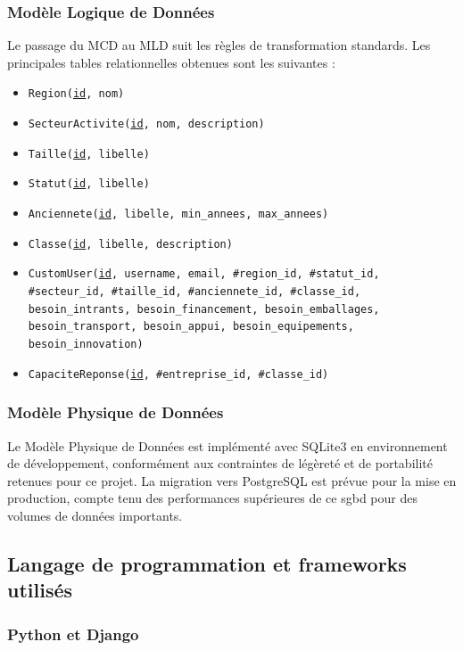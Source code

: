 \documentclass[12pt, a4paper, oneside]{report}
\begin{document}
\subsubsection{Modèle Logique de Données}

Le passage du MCD au MLD suit les règles de transformation standards. Les principales tables relationnelles obtenues sont les suivantes :

\begin{itemize}
  \item \texttt{Region(\underline{id}, nom)}
  \item \texttt{SecteurActivite(\underline{id}, nom, description)}
  \item \texttt{Taille(\underline{id}, libelle)}
  \item \texttt{Statut(\underline{id}, libelle)}
  \item \texttt{Anciennete(\underline{id}, libelle, min\_annees, max\_annees)}
  \item \texttt{Classe(\underline{id}, libelle, description)}
  \item \texttt{CustomUser(\underline{id}, username, email, \#region\_id, \#statut\_id, \#secteur\_id, \#taille\_id, \#anciennete\_id, \#classe\_id, besoin\_intrants, besoin\_financement, besoin\_emballages, besoin\_transport, besoin\_appui, besoin\_equipements, besoin\_innovation)}
  \item \texttt{CapaciteReponse(\underline{id}, \#entreprise\_id, \#classe\_id)}
\end{itemize}

\subsubsection{Modèle Physique de Données}

Le Modèle Physique de Données est implémenté avec SQLite3 en environnement de développement, conformément aux contraintes de légèreté et de portabilité retenues pour ce projet. La migration vers PostgreSQL est prévue pour la mise en production, compte tenu des performances supérieures de ce \gls{sgbd} pour des volumes de données importants.

\subsection{Langage de programmation et frameworks utilisés}

\subsubsection{Python et Django}
\end{document}
